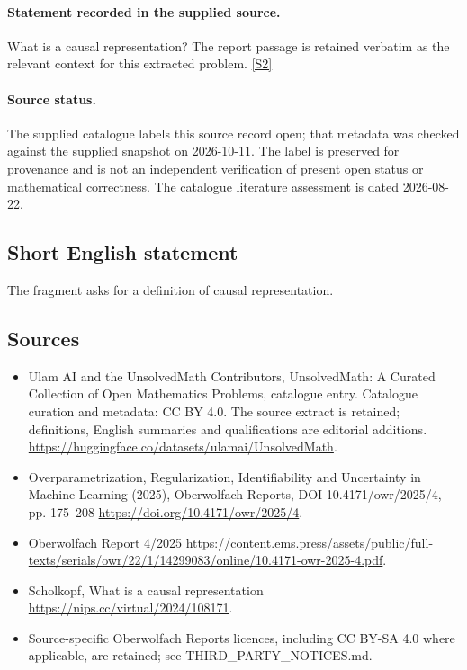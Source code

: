 \documentclass[11pt]{article}
\begin{document}
\paragraph{Statement recorded in the supplied source.}
What is a causal representation? The report passage is retained verbatim as the relevant context for this extracted problem. \href{https://doi.org/10.4171/owr/2025/4}{[S2]}
\paragraph{Source status.}
The supplied catalogue labels this source record open; that metadata was checked against the supplied snapshot on 2026-10-11. The label is preserved for provenance and is not an independent verification of present open status or mathematical correctness. The catalogue literature assessment is dated 2026-08-22.
\subsection{Short English statement}
The fragment asks for a definition of causal representation.
\subsection{Sources}
\begin{itemize}
\item[S1] Ulam AI and the UnsolvedMath Contributors, UnsolvedMath: A Curated Collection of Open Mathematics Problems, catalogue entry. Catalogue curation and metadata: CC BY 4.0. The source extract is retained; definitions, English summaries and qualifications are editorial additions.
\url{https://huggingface.co/datasets/ulamai/UnsolvedMath}.
\item[S2] Overparametrization, Regularization, Identifiability and Uncertainty in Machine Learning (2025), Oberwolfach Reports, DOI 10.4171/owr/2025/4, pp. 175--208
\url{https://doi.org/10.4171/owr/2025/4}.
\item[S3] Oberwolfach Report 4/2025
\url{https://content.ems.press/assets/public/full-texts/serials/owr/22/1/14299083/online/10.4171-owr-2025-4.pdf}.
\item[S4] Scholkopf, What is a causal representation
\url{https://nips.cc/virtual/2024/108171}.
\item Source-specific Oberwolfach Reports licences, including CC BY-SA 4.0 where applicable, are retained; see THIRD\_PARTY\_NOTICES.md.
\end{itemize}
\end{document}
